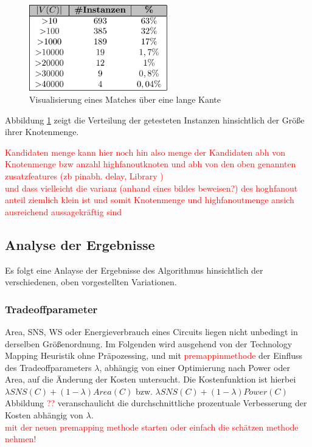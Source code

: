 \documentclass[11pt, a4paper, german]{article}
\newcommand{\TM}{Technology  Mapping }
\begin{document}
  \begin{figure}
		\includegraphics[width = 6cm]{pictures/compiled/instance_sizes_distribution_table}
		\caption{Visualisierung eines Matches über eine lange Kante}
		\label{bild:sizes_table}
	\end{figure}
 Abbildung \ref{bild:sizes_table} zeigt die Verteilung der getesteten Instanzen hinsichtlich der Größe  ihrer Knotenmenge.
 
\textcolor{red}{ Kandidaten menge kann hier noch hin also menge der Kandidaten abh von Knotenmenge bzw anzahl highfanoutknoten  und abh von den oben genannten zusatzfeatures (zb pinabh. delay, Library )  \\  und dass vielleicht die varianz (anhand eines bildes beweisen?) des hoghfanout anteil ziemlich klein ist und somit Knotenmenge und highfanoutmenge ansich ausreichend aussagekräftig sind} 
 
 \subsection{Analyse der Ergebnisse}
 \label{subsec:analyse_der_ergebnisse}
 Es folgt eine Anlayse der Ergebnisse des Algorithmus hinsichtlich der verschiedenen, oben vorgestellten Variationen.
\subsubsection{Tradeoffparameter}
Area, SNS, WS oder Energieverbrauch eines Circuits liegen nicht unbedingt in derselben Größenordnung. Im Folgenden wird ausgehend von der \TM Heuristik ohne Präpozessing, und mit \textcolor{red}{premappinmethode}  der Einfluss des Tradeoffparameters $\lambda$, abhängig von einer Optimierung nach Power oder Area,  auf die Änderung der Kosten untersucht.  Die Kostenfunktion ist hierbei $\lambda SNS(C) + (1-\lambda)Area(C)$ bzw. $\lambda SNS(C) + (1-\lambda)Power(C)$\\
Abbildung \textcolor{red}{??} veranschaulicht die durchschnittliche prozentuale Verbesserung der Kosten abhängig von $\lambda$.\\
\textcolor{red}{mit der neuen premapping methode starten oder einfach die schätzen methode nehmen!}\\
\end{document}
